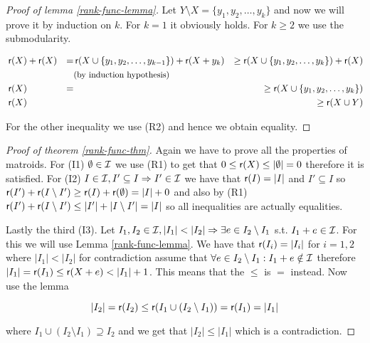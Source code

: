\begin{proof}[Proof of lemma \ref{rank-func-lemma}]
	Let $Y \setminus X = \{y_1, y_2, \dots, y_k\}$ and now we will prove it by induction on $k$. For $k = 1$ it obviously holds. For $k \geq 2$ we use the submodularity.
	
	$$
	\begin{aligned}
		&\operatorname{\textsf{r}}(X) + \operatorname{\textsf{r}}(X) &= &\operatorname{\textsf{r}}(X \cup \{y_1, y_2, \dots, y_{k-1}\}) + \operatorname{\textsf{r}}(X + y_k) &\geq \operatorname{\textsf{r}}(X \cup \{y_1, y_2, \dots, y_k\}) + \operatorname{\textsf{r}}(X)\\
		&                    &  & \text{\small{(by induction hypothesis)}}\\
		&\operatorname{\textsf{r}}(X)            &= &                                                            &\geq \operatorname{\textsf{r}}(X \cup \{y_1, y_2, \dots, y_k\})\\
		&\operatorname{\textsf{r}}(X)            &  &                                                            &\geq \operatorname{\textsf{r}}(X \cup Y)\\
	\end{aligned}
	$$
	
	\noindent For the other inequality we use (R2) and hence we obtain equality.
\end{proof}

\begin{proof}[Proof of theorem \ref{rank-func-thm}]
	Again we have to prove all the properties of matroids. For (I1) $\emptyset \in \mathcal{I}$ we use (R1) to get that $0 \leq \operatorname{\textsf{r}} (X) \leq |\emptyset| = 0$ therefore it is satisfied. For (I2) $I \in \mathcal{I}, I' \subseteq I \Rightarrow I' \in \mathcal{I}$ we have that $\operatorname{\textsf{r}}(I) = |I|$ and $I' \subseteq  I$ so $\operatorname{\textsf{r}}(I') + \operatorname{\textsf{r}}(I \setminus I') \geq \operatorname{\textsf{r}}(I) + \operatorname{\textsf{r}}(\emptyset) = |I| + 0$ and also by (R1) $\operatorname{\textsf{r}}(I') + \operatorname{\textsf{r}}(I \setminus I') \leq |I'| + |I \setminus I'| = |I|$ so all inequalities are actually equalities.
	
	Lastly the third (I3). Let $I_1, I_2 \in \mathcal{I}, |I_1| < |I_2| \Rightarrow \exists e \in I_2 \setminus I_1$ s.t. $I_1 + e \in \mathcal{I}$. For this we will use Lemma \ref{rank-func-lemma}. We have that $\operatorname{\textsf{r}}(I_i) = |I_i|$ for $i=1,2$ where $|I_1| < |I_2|$ for contradiction assume that $\forall e \in I_2 \setminus I_1 : I_1 + e \notin \mathcal{I}$ therefore $|I_1| = \operatorname{\textsf{r}}(I_1) \leq \operatorname{\textsf{r}}(X+e) < |I_1| + 1$. This means that the $\leq$ is $=$ instead. Now use the lemma
	
	$$
	|I_2| = \operatorname{\textsf{r}}(I_2) \leq \operatorname{\textsf{r}}(I_1 \cup (I_2 \setminus I_1)) = \operatorname{\textsf{r}}(I_1) = |I_1|
	$$
	
	\noindent where $I_1 \cup (I_2 \setminus I_1) \supseteq I_2$ and we get that $|I_2| \leq |I_1|$ which is a contradiction.
\end{proof}

